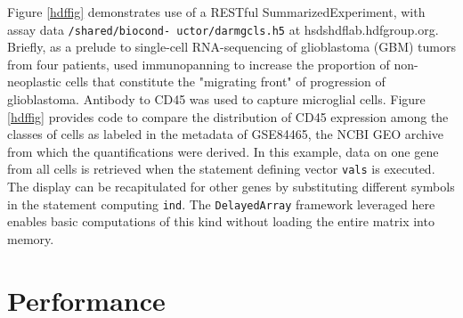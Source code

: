 \documentclass[applications]{gen-bioinformatics}
\newcommand{\Rpackage}[1]{{\textit{#1}}}
\begin{document}
Figure \ref{hdffig}
demonstrates use of a RESTful SummarizedExperiment,
with assay data \texttt{/shared/biocond- uctor/darmgcls.h5}
at hsdshdflab.hdfgroup.org.  Briefly, as a
prelude to single-cell RNA-sequencing of glioblastoma (GBM)
tumors from four patients,
\cite{Darmanis2017} used immunopanning to increase the
proportion of non-neoplastic cells that constitute
the "migrating front" of progression of glioblastoma.
Antibody to CD45 was used to capture microglial cells.
Figure \ref{hdffig} provides code to compare
the distribution of CD45 expression among the
classes of
cells as labeled in the metadata of GSE84465,
the NCBI GEO archive from which the quantifications
were derived.  
In this example, data on one
gene from all cells
is retrieved when the statement defining vector \texttt{vals}
is executed.  The display can be recapitulated for
other genes by substituting different symbols in
the statement computing \texttt{ind}.
The \verb+DelayedArray+ framework leveraged here
enables basic computations of this kind without loading the
entire matrix into memory.



\noindent



\section*{Performance}
\end{document}
